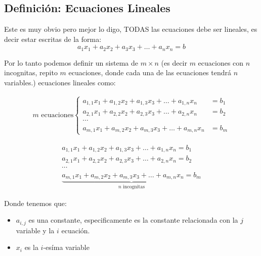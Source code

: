 \documentclass[12pt, fleqn]{report}                             %
\theoremstyle{break}                                            %
\begin{document}
            \subsection{Definición: Ecuaciones Lineales}

                Este es muy obvio pero mejor lo digo, TODAS las ecuaciones debe ser lineales,
                es decir estar escritas de la forma:
                \begin{equation*}
                    a_1x_1 + a_2x_2 + a_3x_3 + \dots + a_nx_n = b
                \end{equation*}

                Por lo tanto podemos definir un sistema de $m \times n$ (es decir $m$ ecuaciones
                con $n$ incognitas, repito $m$ ecuaciones, donde cada una de las ecuaciones tendrá
                $n$ variables.) ecuaciones lineales como:

                \begin{align*}
                    m \text{ ecuaciones}
                    \begin{cases}
                        a_{1,1}x_1 + a_{1,2}x_2 + a_{1,3}x_3 + \dots + a_{1,n}x_n &= b_1  \\
                        a_{2,1}x_1 + a_{2,2}x_2 + a_{2,3}x_3 + \dots + a_{2,n}x_n &= b_2  \\
                        \cdots                                                            \\
                        a_{m,1}x_1 + a_{m,2}x_2 + a_{m,3}x_3 + \dots + a_{m,n}x_n &= b_m  
                    \end{cases}      
                \end{align*}

                \begin{align*}
                    a_{1,1}x_1 + a_{1,2}x_2 + a_{1,3}x_3 + \dots + a_{1,n}x_n = b_1    \\
                    a_{2,1}x_1 + a_{2,2}x_2 + a_{2,3}x_3 + \dots + a_{2,n}x_n = b_2    \\
                    \cdots                                                             \\
                    \underbrace{a_{m,1}x_1 + a_{m,2}x_2 + a_{m,3}x_3 + \dots + a_{m,n}x_n = b_m}_\text{$n$ incognitas}
                \end{align*}

                Donde tenemos que:
                \begin{itemize}
                    \item $a_{i, j}$ es una constante, especificamente es la constante
                        relacionada con la $j$ variable y la $i$ ecuación.

                    \item $x_{i}$ es la $i$-esíma variable
                \end{itemize}
\end{document}
